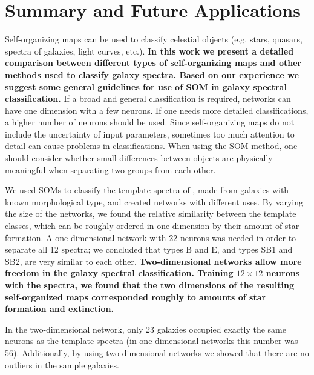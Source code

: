 \documentclass[useAMS,usenatbib]{mn2e}
\begin{document}
\section{Summary and Future Applications}
\label{sec: summary_SOMZ}

    Self-organizing maps can be used to classify celestial objects (e.g. stars, quasars, spectra of galaxies, light curves, etc.).
    {\bf In this work we present a detailed comparison between different types of self-organizing maps and other methods used to classify galaxy spectra.
    Based on our experience we suggest some general guidelines for use of SOM in galaxy spectral classification.}
    If a broad and general classification is required, networks can have one dimension with a few neurons. 
    If one needs more detailed classifications, a higher number of neurons should be used.
    Since self-organizing maps do not include the uncertainty of input parameters, sometimes too much attention to detail can cause problems in classifications. 
    When using the SOM method, one should consider whether small differences between objects are physically meaningful when separating two groups from each other.

    We used SOMs to classify the template spectra of , made from galaxies with known morphological type, and created networks with different uses.
    By varying the size of the networks, we found the relative similarity between the  template classes, which can be roughly ordered in one dimension by their amount of star formation.
     A one-dimensional network with 22 neurons was needed in order to
    separate all 12  spectra; we concluded that  types B and E, and types SB1 and SB2, are very similar to each other.
    \textbf{Two-dimensional networks allow more freedom in the galaxy spectral classification.
    Training $12\times 12$ neurons with the  spectra, we found that the two dimensions of the resulting self-organized maps corresponded roughly to amounts of star formation and extinction.}
    
    In the two-dimensional network, only 23 galaxies occupied exactly the same neurons as the  template spectra (in one-dimensional networks this number was 56).
    Additionally, by using two-dimensional networks we showed that there are no outliers in the sample galaxies.
\end{document}
